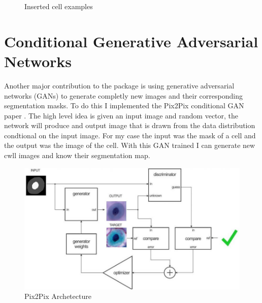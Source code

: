 \documentclass[ms,electronic,oneside,twosidetoc,letterpaper,chaptercenter,parttop]{byumsphd}
\begin{document}
\begin{figure}[H]
   \quad
  \caption{Inserted cell examples}
\end{figure}


\section{Conditional Generative Adversarial Networks}

Another major contribution to the package is using generative adversarial networks (GANs) to
generate completly new images and their corresponding segmentation masks. To do this I implemented
the Pix2Pix conditional GAN paper \cite{pix2pix}. The high level idea is given an input image and random vector, the network
will produce and output image that is drawn from the data distribution condtional on the input image. For my 
case the input was the mask of a cell and the output was the image of the cell. With this GAN trained I can
generate new cwll images and know their segmentation map.

\begin{figure}[H]
  \centering
  \includegraphics[width=.9\textwidth]{pix2pix}
  \caption{Pix2Pix Archetecture \cite{pix2pix-image}}
\end{figure}
\end{document}
